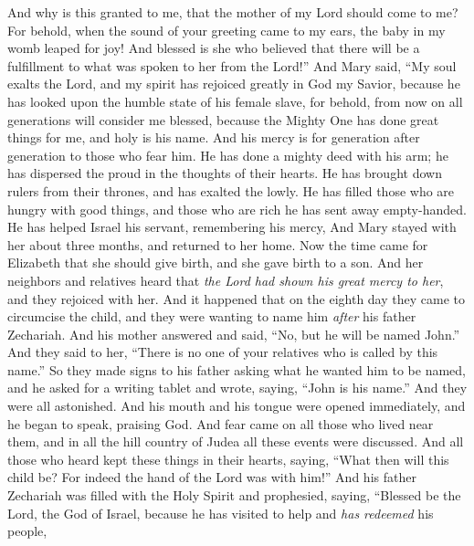 \begin{biblechapter}
\verse And why is this granted to me, that the mother of my Lord should come to me?
\verse For behold, when the sound of your greeting came to my ears, the baby in my womb leaped for joy!
\verse And blessed is she who believed that there will be a fulfillment to what was spoken to her from the Lord!”
 And Mary said,
\verse “My soul exalts the Lord,
\verse and my spirit has rejoiced greatly in God my Savior,
\verse because he has looked upon the humble state of his female slave, 
for behold, from now on all generations will consider me blessed,
\verse because the Mighty One has done great things for me, 
and holy is his name.
\verse And his mercy is for generation after generation 
to those who fear him.
\verse He has done a mighty deed with his arm; 
he has dispersed the proud in the thoughts of their hearts.
\verse He has brought down rulers from their thrones, 
and has exalted the lowly.
\verse He has filled those who are hungry with good things, 
and those who are rich he has sent away empty-handed.
\verse He has helped Israel his servant, 
remembering his mercy,
\verse And Mary stayed with her about three months, and returned to her home.
 Now the time came for Elizabeth that she should give birth, and she gave birth to a son.
\verse And her neighbors and relatives heard that \textit{the Lord had shown his great mercy to her}, and they rejoiced with her.
\verse And it happened that on the eighth day they came to circumcise the child, and they were wanting to name him \textit{after} his father Zechariah.
\verse And his mother answered and said, “No, but he will be named John.”
\verse And they said to her, “There is no one of your relatives who is called by this name.”
\verse So they made signs to his father asking what he wanted him to be named,
\verse and he asked for a writing tablet and wrote, saying, “John is his name.” And they were all astonished.
\verse And his mouth and his tongue were opened immediately, and he began to speak, praising God.
\verse And fear came on all those who lived near them, and in all the hill country of Judea all these events were discussed.
\verse And all those who heard kept these things in their hearts, saying, “What then will this child be? For indeed the hand of the Lord was with him!”
 And his father Zechariah was filled with the Holy Spirit and prophesied, saying,
\verse “Blessed be the Lord, the God of Israel, 
because he has visited to help and \textit{has redeemed} his people,

\end{biblechapter}
